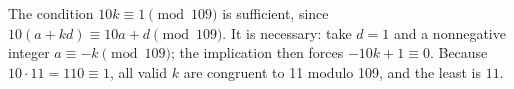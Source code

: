 The condition $ 10k\equiv1\pmod{109}$ is sufficient, since $ 10(a+kd)\equiv10a+d\pmod{109}$. It is necessary: take $ d=1 $ and a nonnegative integer $ a\equiv-k\pmod{109}$; the implication then forces $-10k+1\equiv0 $. Because $ 10\cdot11=110\equiv1 $, all valid $ k $ are congruent to 11 modulo 109, and the least is $\boxed{11}$.
